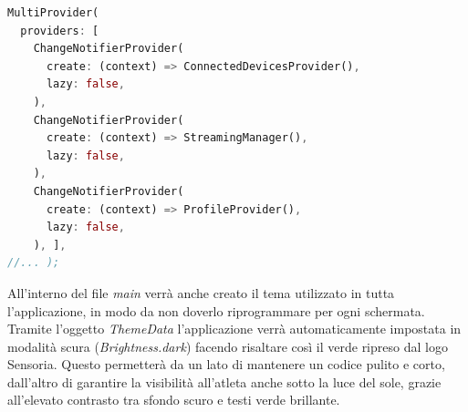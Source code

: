 \documentclass[target=bach,aauheader=,style=]{thud}
\begin{document}
\begin{lstlisting}[language=dart, caption={Implementazione del MultiProvider nel livello più alto del widget tree.}, label={main_providers}]
MultiProvider(
  providers: [
    ChangeNotifierProvider(
      create: (context) => ConnectedDevicesProvider(),
      lazy: false,
    ),
    ChangeNotifierProvider(
      create: (context) => StreamingManager(),
      lazy: false,
    ),
    ChangeNotifierProvider(
      create: (context) => ProfileProvider(),
      lazy: false, 
    ), ],
//... );
\end{lstlisting}
All'interno del file \textit{main} verrà anche creato il tema utilizzato in tutta l'applicazione, in modo da non doverlo riprogrammare per ogni schermata. Tramite l'oggetto \textit{ThemeData} l'applicazione verrà automaticamente impostata in modalità scura (\textit{Brightness.dark}) facendo risaltare così il verde ripreso dal logo Sensoria. Questo permetterà da un lato di mantenere un codice pulito e corto, dall'altro di garantire la visibilità all'atleta anche sotto la luce del sole, grazie all'elevato contrasto tra sfondo scuro e testi verde brillante.
\end{document}
